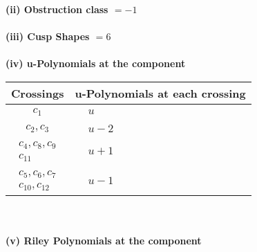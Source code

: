 \documentclass[1p]{elsarticle_modified}
\theoremstyle{definition}
\begin{document}
\flushleft \textbf{(ii) Obstruction class $= -1$}\\~\\
\flushleft \textbf{(iii) Cusp Shapes $= 6$}\\~\\
\newpage\renewcommand{\arraystretch}{1}
\flushleft \textbf{(iv) u-Polynomials at the component}\newline \\
\begin{tabular}{m{50pt}|m{274pt}}
Crossings & \hspace{64pt}u-Polynomials at each crossing \\
\hline $$\begin{aligned}c_{1}\end{aligned}$$&$\begin{aligned}
&u
\end{aligned}$\\
\hline $$\begin{aligned}c_{2},c_{3}\end{aligned}$$&$\begin{aligned}
&u-2
\end{aligned}$\\
\hline $$\begin{aligned}c_{4},c_{8},c_{9}\\c_{11}\end{aligned}$$&$\begin{aligned}
&u+1
\end{aligned}$\\
\hline $$\begin{aligned}c_{5},c_{6},c_{7}\\c_{10},c_{12}\end{aligned}$$&$\begin{aligned}
&u-1
\end{aligned}$\\
\hline
\end{tabular}\\~\\
\newpage\renewcommand{\arraystretch}{1}
\flushleft \textbf{(v) Riley Polynomials at the component}\newline \\
\end{document}
